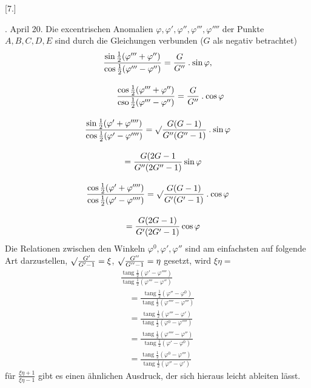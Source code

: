 \par\medskip{}\centerline{[7.]}\nobreak{}. April 20. Die excentrischen Anomalien $\varphi,\varphi',\varphi'',\varphi''',\varphi''''$ der Punkte
$A,B,C,D,E$ sind durch die Gleichungen verbunden ($G$ als negativ betrachtet)
\[
\begin{gathered} \frac{\sin\frac12(\varphi'''+\varphi'')}{\cos\frac12(\varphi'''-\varphi'')} =\frac{G}{G''}\mathbin{.}\sin\varphi,\\[9pt]\quad{}\qquad \frac{\cos\frac12(\varphi'''+\varphi'')}{\operatorname{cso}\frac12(\varphi'''-\varphi'')} =\frac{G}{G''}\mathbin{.}\cos\varphi\\[9pt] \frac{\sin\frac12(\varphi'+\varphi'''')}{\cos\frac12(\varphi'-\varphi'''')} =\surd\frac{G(G-1)}{G''(G''-1)}\mathbin{.}\sin\varphi \\[9pt]\quad{}=\frac{G(2G-1}{G''(2G''-1)}\sin\varphi\\[9pt] \frac{\cos\frac12(\varphi'+\varphi'''')}{\cos\frac12(\varphi'-\varphi'''')} =\surd\frac{G(G-1)}{G'(G'-1)}\mathbin{.}\cos\varphi \\[9pt]\quad{}=\frac{G(2G-1)}{G'(2G'-1)}\cos\varphi \end{gathered}
\]
Die Relationen zwischen den Winkeln $\varphi^0,\varphi',\varphi''$ sind am einfachsten auf
folgende Art darzustellen, $\surd\frac{G'}{G'-1}=\xi$, $\surd\frac{G''}{G''-1}=\eta$ gesetzt, wird $\xi\eta=$
\[
\begin{gathered}\frac{\operatorname{tang}\frac12(\varphi'-\varphi'''')}{\operatorname{tang}\frac12(\varphi'''-\varphi'')} \\[9pt]\quad{}=\frac{\operatorname{tang}\frac12(\varphi''-\varphi^0)}{\operatorname{tang}\frac12(\varphi''''-\varphi''')} \\[9pt]\quad{}=\frac{\operatorname{tang}\frac12(\varphi'''-\varphi')}{\operatorname{tang}\frac12(\varphi^0-\varphi'''')} \\[9pt]\quad{}=\frac{\operatorname{tang}\frac12(\varphi''''-\varphi'')}{\operatorname{tang}\frac12(\varphi'-\varphi^0)} \\[9pt]\quad{}=\frac{\operatorname{tang}\frac12(\varphi^0-\varphi''')}{\operatorname{tang}\frac12(\varphi''-\varphi')}\end{gathered}
\]
für $\frac{\xi\eta+1}{\xi\eta-1}$ gibt es einen ähnlichen Ausdruck, der sich hieraus leicht ableiten lässt.




